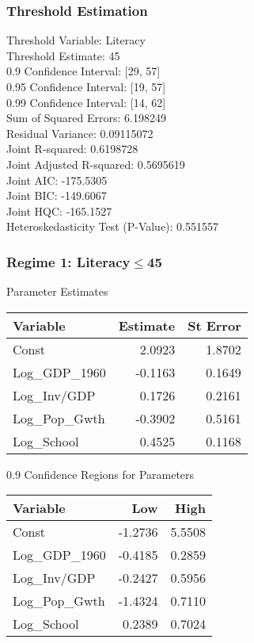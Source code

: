 \subsubsection{Threshold Estimation} 
Threshold Variable:                 Literacy \\
Threshold Estimate:                 45 \\
0.9 Confidence Interval:           [29, 57] \\
0.95 Confidence Interval:           [19, 57] \\
0.99 Confidence Interval:           [14, 62] \\
Sum of Squared Errors:              6.198249 \\
Residual Variance:                  0.09115072 \\
Joint R-squared:                    0.6198728 \\
Joint Adjusted R-squared:           0.5695619 \\
Joint AIC:                          -175.5305 \\
Joint BIC:                          -149.6067 \\
Joint HQC:                          -165.1527 \\
Heteroskedasticity Test (P-Value):  0.551557 \\

\subsubsection*{Regime 1: Literacy$\leq$45 } 
Parameter Estimates \\
\begin{tabular}{l*{2}{r}}
\toprule
Variable    &   Estimate     &   St Error \\
\midrule 
Const   &    2.0923   &   1.8702 \\
Log\_GDP\_1960   &   -0.1163   &   0.1649 \\
Log\_Inv/GDP   &    0.1726   &   0.2161 \\
Log\_Pop\_Gwth   &   -0.3902   &   0.5161 \\
Log\_School   &    0.4525   &   0.1168 \\
\bottomrule
\end{tabular}
\bigskip 

0.9 Confidence Regions for Parameters \\
\begin{tabular}{l*{2}{r}}
\toprule
Variable   &    Low            &   High \\
\midrule 
Const   &   -1.2736   &   5.5508 \\
Log\_GDP\_1960   &   -0.4185   &   0.2859 \\
Log\_Inv/GDP   &   -0.2427   &   0.5956 \\
Log\_Pop\_Gwth   &   -1.4324   &   0.7110 \\
Log\_School   &    0.2389   &   0.7024 \\
\bottomrule
\end{tabular}
\bigskip 

